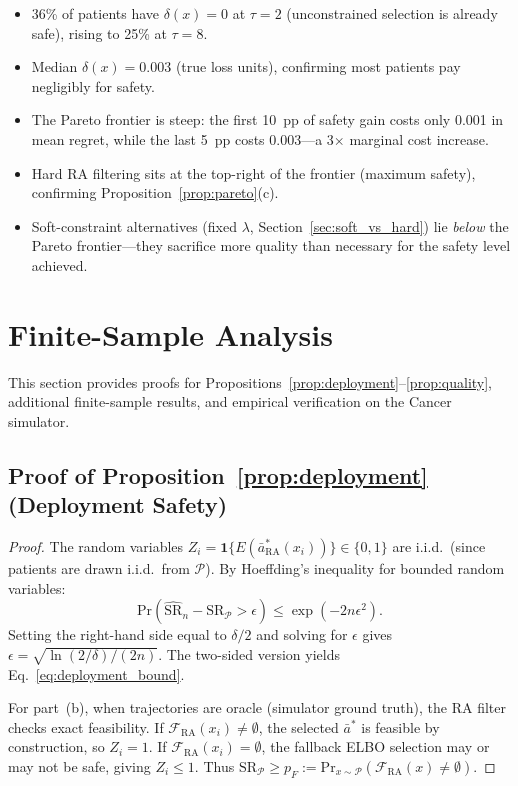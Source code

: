 \documentclass{article}
\renewcommand{\Pr}{\mathrm{Pr}}
\newcommand{\ba}{\bar{a}}
\newcommand{\cF}{\mathcal{F}}
\newcommand{\ind}{\mathbf{1}}
\newcommand{\cP}{\mathcal{P}}
\begin{document}
\begin{itemize}[leftmargin=*,topsep=2pt,itemsep=1pt]
\item 36\% of patients have $\delta(x) = 0$ at $\tau = 2$ (unconstrained selection is already safe), rising to 25\% at $\tau = 8$.
\item Median $\delta(x) = 0.003$ (true loss units), confirming most patients pay negligibly for safety.
\item The Pareto frontier is steep: the first 10~pp of safety gain costs only 0.001 in mean regret, while the last 5~pp costs 0.003---a 3$\times$ marginal cost increase.
\item Hard RA filtering sits at the top-right of the frontier (maximum safety), confirming Proposition~\ref{prop:pareto}(c).
\item Soft-constraint alternatives (fixed $\lambda$, Section~\ref{sec:soft_vs_hard}) lie \emph{below} the Pareto frontier---they sacrifice more quality than necessary for the safety level achieved.
\end{itemize}


\section{Finite-Sample Analysis}
\label{app:finite_sample}

This section provides proofs for Propositions~\ref{prop:deployment}--\ref{prop:quality}, additional finite-sample results, and empirical verification on the Cancer simulator.

\subsection{Proof of Proposition~\ref{prop:deployment} (Deployment Safety)}

\begin{proof}
The random variables $Z_i = \ind\{E(\ba^*_{\mathrm{RA}}(x_i))\} \in \{0, 1\}$ are i.i.d.\ (since patients are drawn i.i.d.\ from $\cP$). By Hoeffding's inequality for bounded random variables:
\[
\Pr\!\left(\widehat{\mathrm{SR}}_n - \mathrm{SR}_\cP > \epsilon\right) \leq \exp(-2n\epsilon^2).
\]
Setting the right-hand side equal to $\delta/2$ and solving for $\epsilon$ gives $\epsilon = \sqrt{\ln(2/\delta)/(2n)}$. The two-sided version yields Eq.~\eqref{eq:deployment_bound}.

For part~(b), when trajectories are oracle (simulator ground truth), the RA filter checks exact feasibility. If $\cF_{\mathrm{RA}}(x_i) \neq \emptyset$, the selected $\ba^*$ is feasible by construction, so $Z_i = 1$. If $\cF_{\mathrm{RA}}(x_i) = \emptyset$, the fallback ELBO selection may or may not be safe, giving $Z_i \leq 1$. Thus $\mathrm{SR}_\cP \geq p_F := \Pr_{x \sim \cP}(\cF_{\mathrm{RA}}(x) \neq \emptyset)$.
\end{proof}
\end{document}

